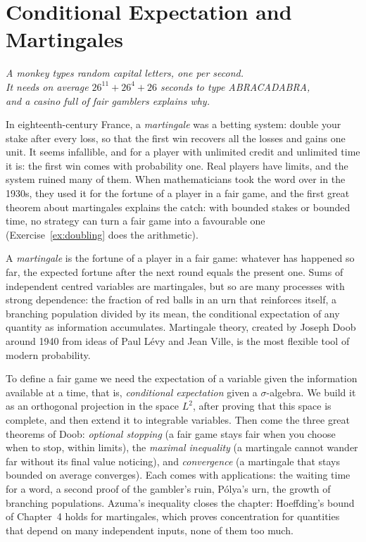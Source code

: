 \chapter{Conditional Expectation and Martingales}

\begin{center}\itshape
A monkey types random capital letters, one per second.\\
It needs on average $26^{11}+26^4+26$ seconds to type ABRACADABRA,\\
and a casino full of fair gamblers explains why.
\end{center}

In eighteenth-century France, a \emph{martingale} was a betting system: double your stake after every loss, so that the first win recovers all the
losses and gains one unit. It seems infallible, and for a player with unlimited credit and unlimited time it is: the first win comes with probability one.
Real players have limits, and the system ruined many of them. When mathematicians took the word over in the 1930s, they used it for the fortune of a
player in a fair game, and the first great theorem about martingales explains the catch: with bounded stakes or bounded time, no strategy can turn a
fair game into a favourable one (Exercise~\ref{ex:doubling} does the arithmetic).

A \emph{martingale} is the fortune of a player in a fair game: whatever has happened so far, the expected fortune after
the next round equals the present one. Sums of independent centred variables are martingales, but so are many
processes with strong dependence: the fraction of red balls in an urn that reinforces itself, a branching population
divided by its mean, the conditional expectation of any quantity as information accumulates. Martingale theory, created
by Joseph Doob around 1940 from ideas of Paul L\'evy and Jean Ville, is the most flexible tool of modern probability.

To define a fair game we need the expectation of a variable given the information available at a time, that is,
\emph{conditional expectation} given a $\sigma$-algebra. We build it as an orthogonal projection in the space $L^2$, after
proving that this space is complete, and then extend it to integrable variables. Then come the three great theorems of
Doob: \emph{optional stopping} (a fair game stays fair when you choose when to stop, within limits), the \emph{maximal
inequality} (a martingale cannot wander far without its final value noticing), and \emph{convergence} (a martingale that
stays bounded on average converges). Each comes with applications: the waiting time for a word, a second proof of the
gambler's ruin, P\'olya's urn, the growth of branching populations. Azuma's inequality closes the chapter: Hoeffding's
bound of Chapter~4 holds for martingales, which proves concentration for quantities that depend on many independent
inputs, none of them too much.

